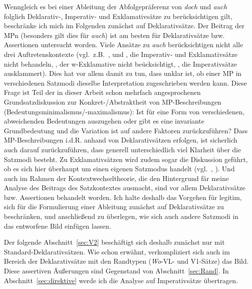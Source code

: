 {Wenngleich es bei einer Ableitung der Abfolgepräferenz von \textit{doch} und \textit{auch} folglich Deklarativ-, Imperativ- und Exklamativsätze zu berücksichtigen gilt, be\-schränke ich mich im Folgenden zunächst auf  Deklarativsätze. Der Beitrag der MPn (besonders gilt dies für \textit{auch}) ist am besten für Deklarativsätze bzw. Assertionen  untersucht worden. Viele Ansätze zu \textit{auch} berücksichtigen nicht alle drei Auftretenskontexte (vgl.\ z.B.\ \citealt{Franck1980}, \citealt[100--105]{Burkhardt1982} und \citealt{Ickler1994}, die Imperativ- und Exklamativsätze nicht behandeln, \citealt{Dahl1988}, der w-Exklamative nicht beücksichtigt, \citealt[222]{Karagjosova2004}, die Imperativsätze aus\-klammert). Dies hat vor allem damit zu tun, dass unklar ist, ob einer MP in verschiedenen Satzmodi dieselbe Interpretation zugeschrieben werden kann. Diese Frage ist Teil der in dieser Arbeit schon mehrfach angesprochenen Grundsatzdiskussion zur Konkret-/Abstraktheit von  MP-Beschreibungen (Bedeutungs\-minimalismus/-maximalismus): Ist für eine Form von verschiedenen, abweichenden Bedeutungen auszugehen oder gibt es eine invariante Grundbedeutung und die Variation ist auf andere Faktoren zurückzuführen? Dass MP-Beschreibungen i.d.R. anhand von Deklarativsätzen erfolgen, ist sicherlich auch darauf zurückzuführen, dass generell unterschiedlich viel Klarheit über die Satzmodi besteht. Zu Exklamativsätzen wird zudem sogar die Diskussion geführt, ob es sich hier überhaupt um einen eigenen Satzmodus  handelt (vgl.\ \citealt{Naef1987}, \citealt{Rosengren1992, Rosengren1997}). Und auch im Rahmen der  Kontextwechseltheorie, die den Hintergrund fär meine Analyse des Beitrags des Satzkontextes ausmacht, sind vor allem Deklarativsätze bzw. Assertionen behandelt worden. Ich halte deshalb das Vorgehen für legitim, sich für die Formulierung einer Ableitung zunächst auf Deklarativsätze zu beschränken, und anschließend zu überlegen, wie sich auch andere Satzmodi in das entworfene Bild einfügen lassen. 

Der folgende Abschnitt~\ref{sec:V2} beschäftigt sich deshalb zunächst nur mit Standard-Deklarativsätzen. Wie schon erwähnt, verkompliziert sich auch im Bereich der Deklarativsätze mit den Randtypen (\textit{Wo}-VL- und V1-Sätze) das Bild. Diese assertiven Äußerungen sind Gegenstand von Abschnitt~\ref{sec:Rand}. In Abschnitt~\ref{sec:direktive} werde ich die Analyse auf Imperativsätze übertragen. 

}
